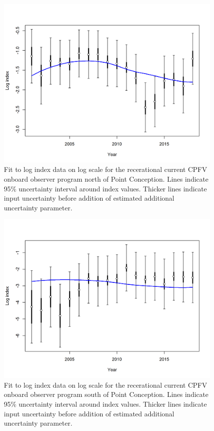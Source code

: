 \documentclass[12pt,]{article}
\begin{document}
\begin{figure}
\centering
\includegraphics{r4ss/plots_mod1/index5_logcpuefit_RecOnboardNorth.png}
\caption{Fit to log index data on log scale for the recerational current
CPFV onboard observer program north of Point Conception. Lines indicate
95\% uncertainty interval around index values. Thicker lines indicate
input uncertainty before addition of estimated additional uncertainty
parameter. \label{fig:index5_logcpuefit_RecOnboardNorth}}
\end{figure}

\begin{figure}
\centering
\includegraphics{r4ss/plots_mod1/index5_logcpuefit_RecOnboardSouth.png}
\caption{Fit to log index data on log scale for the recerational current
CPFV onboard observer program south of Point Conception. Lines indicate
95\% uncertainty interval around index values. Thicker lines indicate
input uncertainty before addition of estimated additional uncertainty
parameter. \label{fig:index5_logcpuefit_RecOnboardSouth}}
\end{figure}
\end{document}
